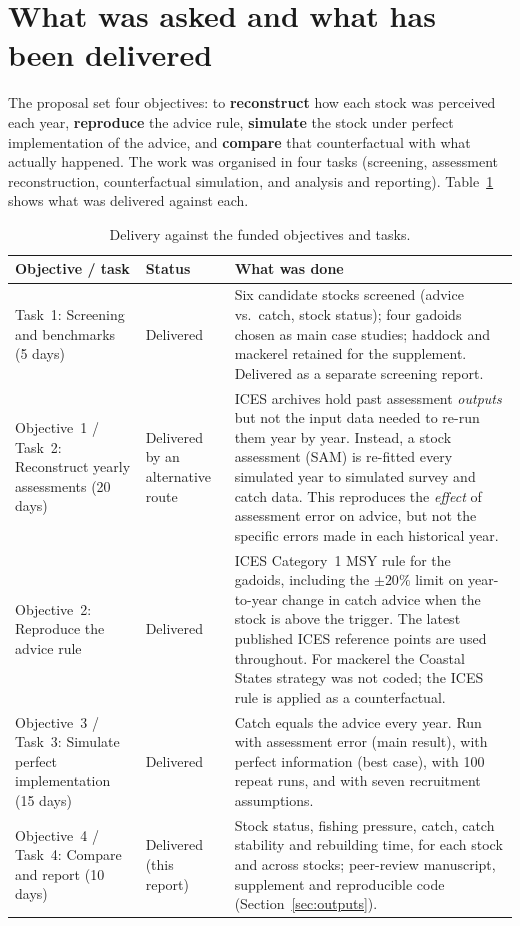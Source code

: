 \documentclass[11pt,a4paper]{article}
\begin{document}
\section{What was asked and what has been delivered}
\label{sec:asked}

The proposal set four objectives: to \textbf{reconstruct} how each stock
was perceived each year, \textbf{reproduce} the advice rule,
\textbf{simulate} the stock under perfect implementation of the advice,
and \textbf{compare} that counterfactual with what actually happened. The
work was organised in four tasks (screening, assessment reconstruction,
counterfactual simulation, and analysis and reporting).
Table~\ref{tab:delivery} shows what was delivered against each.

\begin{table}[htbp]
\centering
\small
\caption{Delivery against the funded objectives and tasks.}
\label{tab:delivery}
\begin{tabularx}{\textwidth}{@{}p{3.6cm}p{1.9cm}X@{}}
\toprule
Objective / task & Status & What was done \\
\midrule
Task~1: Screening and benchmarks (5 days)
 & Delivered
 & Six candidate stocks screened (advice vs.\ catch, stock status);
   four gadoids chosen as main case studies; haddock and mackerel
   retained for the supplement. Delivered as a separate screening
   report. \\
Objective~1 / Task~2: Reconstruct yearly assessments (20 days)
 & Delivered by an alternative route
 & ICES archives hold past assessment \emph{outputs} but not the input data
   needed to re-run them year by year. Instead, a stock assessment (SAM)
   is re-fitted every simulated year to simulated survey and catch data.
   This reproduces the \emph{effect} of assessment error on advice, but not
   the specific errors made in each historical year. \\
Objective~2: Reproduce the advice rule
 & Delivered
 & ICES Category~1 MSY rule for the gadoids, including the $\pm20\%$ limit
   on year-to-year change in catch advice when the stock is above the
   trigger. The latest published ICES reference points are used
   throughout. For mackerel the Coastal States strategy was not coded;
   the ICES rule is applied as a counterfactual. \\
Objective~3 / Task~3: Simulate perfect implementation (15 days)
 & Delivered
 & Catch equals the advice every year. Run with assessment error (main
   result), with perfect information (best case), with 100 repeat runs, and
   with seven recruitment assumptions. \\
Objective~4 / Task~4: Compare and report (10 days)
 & Delivered (this report)
 & Stock status, fishing pressure, catch, catch stability and rebuilding
   time, for each stock and across stocks; peer-review manuscript,
   supplement and reproducible code (Section~\ref{sec:outputs}). \\
\bottomrule
\end{tabularx}
\end{table}
\end{document}
